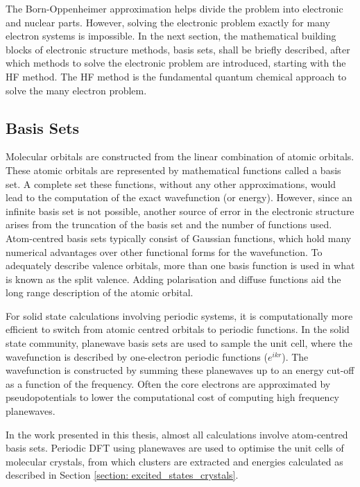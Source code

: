 The Born-Oppenheimer approximation helps divide the problem into electronic and nuclear parts. However, solving the electronic problem exactly for many electron systems is impossible. In the next section, the mathematical building blocks of electronic structure methods, basis sets, shall be briefly described, after which methods to solve the electronic problem are introduced, starting with the \acf{HF} method. The \ac{HF} method is the fundamental quantum chemical approach to solve the many electron problem.
\subsection{Basis Sets}\label{section: methods_basisets}
Molecular orbitals are constructed from the linear combination of atomic orbitals. These atomic orbitals are represented by mathematical functions called a basis set. A complete set these functions, without any other approximations, would lead to the computation of the exact wavefunction (or energy). However, since an infinite basis set is not possible, another source of error in the electronic structure arises from the truncation of the basis set and the number of functions used. Atom-centred basis sets typically consist of Gaussian functions, which hold many numerical advantages over other functional forms for the wavefunction. To adequately describe valence orbitals, more than one basis function is used in what is known as the split valence. Adding polarisation and diffuse functions aid the long range description of the atomic orbital.\cite{Cramer2002}

For solid state calculations involving periodic systems, it is computationally more efficient to switch from atomic centred orbitals to periodic functions. In the solid state community, planewave basis sets are used to sample the unit cell, where the wavefunction is described by one-electron periodic functions ($e^{ikr}$). The wavefunction is constructed by summing these planewaves up to an energy cut-off as a function of the frequency. Often the core electrons are approximated by pseudopotentials to lower the computational cost of computing high frequency planewaves.\cite{Young2001} 

In the work presented in this thesis, almost all calculations involve atom-centred basis sets. Periodic DFT using planewaves are used to optimise the unit cells of molecular crystals, from which clusters are extracted and energies calculated as described in Section \ref{section: excited_states_crystals}. 


